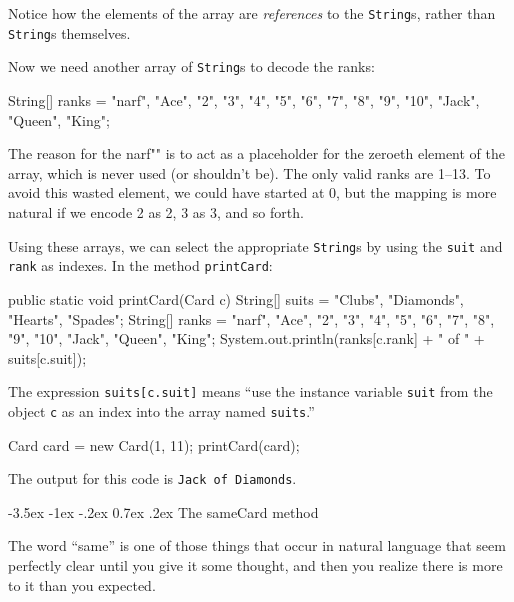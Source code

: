 \documentclass[12pt]{book}
\makeatletter
\theoremstyle{exercise}
\newcommand{\java}[1]{\verb"#1"}
\renewcommand{\section}{\@startsection{section}{1}{\z@}%
    {-3.5ex \@plus -1ex \@minus -.2ex}%
    {0.7ex \@plus.2ex}%
    {\normalfont\Large\bfseries}}
\newcommand{\java}[1]{\lstinline{#1}} %
\makeatother
\begin{document}

Notice how the elements of the array are {\em references} to the \java{String}s, rather than \java{String}s themselves.

Now we need another array of \java{String}s to decode the ranks:

\begin{code}
    String[] ranks = {"narf", "Ace", "2", "3", "4", "5", "6",
               "7", "8", "9", "10", "Jack", "Queen", "King"};
\end{code}

The reason for the \java{"narf"} is to act as a placeholder for the zeroeth element of the array, which is never used (or shouldn't be).
The only valid ranks are 1--13.
To avoid this wasted element, we could have started at 0, but the mapping is more natural if we encode 2 as 2, 3 as 3, and so forth.

Using these arrays, we can select the appropriate \java{String}s by using the \java{suit} and \java{rank} as indexes.
In the method \java{printCard}:

\begin{code}
public static void printCard(Card c) {
    String[] suits = {"Clubs", "Diamonds", "Hearts", "Spades"};
    String[] ranks = {"narf", "Ace", "2", "3", "4", "5", "6",
               "7", "8", "9", "10", "Jack", "Queen", "King"};
    System.out.println(ranks[c.rank] + " of " + suits[c.suit]);
}
\end{code}

The expression \java{suits[c.suit]} means ``use the instance variable \java{suit} from the object \java{c} as an index into the array named \java{suits}.''

\begin{code}
    Card card = new Card(1, 11);
    printCard(card);
\end{code}

The output for this code is {\tt Jack of Diamonds}.


\section{The sameCard method}
\label{equivalence}

The word ``same'' is one of those things that occur in natural language that seem perfectly clear until you give it some thought, and then you realize there is more to it than you expected.

\end{document}
